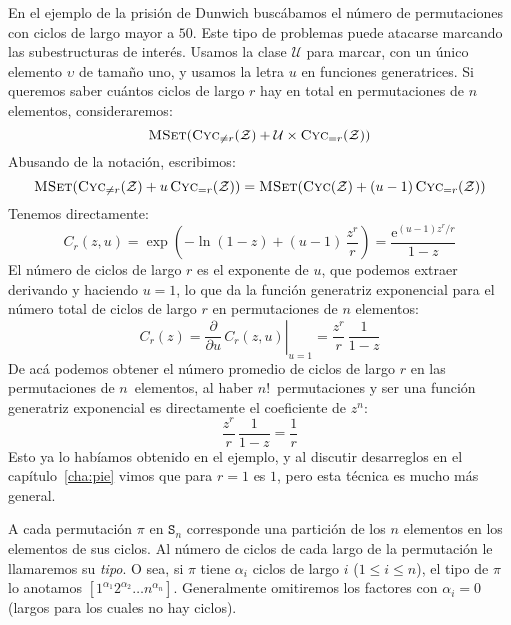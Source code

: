   En el ejemplo de la prisión de Dunwich
  buscábamos el número de permutaciones
  con ciclos de largo mayor a \(50\).
  Este tipo de problemas puede atacarse
  marcando las subestructuras de interés.%
  Usamos la clase \(\mathcal{U}\) para marcar,
  con un único elemento \(\upsilon\) de tamaño uno,
  y usamos la letra \(u\) en funciones generatrices.
  Si queremos saber cuántos ciclos de largo \(r\) hay en total
  en permutaciones de \(n\) elementos,
  consideraremos:
  \begin{equation*}
    \operatorname{\textsc{MSet}}(\operatorname{\textsc{Cyc}}_{\ne r}(\mathcal{Z})
	      + \mathcal{U} \times \operatorname{\textsc{Cyc}}_{= r}(\mathcal{Z}))
  \end{equation*}
  Abusando de la notación,
  escribimos:
  \begin{equation*}
    \operatorname{\textsc{MSet}}(\operatorname{\textsc{Cyc}}_{\ne r}(\mathcal{Z})
	      + u \operatorname{\textsc{Cyc}}_{= r}(\mathcal{Z}))
      = \operatorname{\textsc{MSet}}(\operatorname{\textsc{Cyc}}(\mathcal{Z}) + (u - 1) \operatorname{\textsc{Cyc}}_{= r}(\mathcal{Z}))
  \end{equation*}
  Tenemos directamente:
  \begin{equation*}
    C_r(z, u)
      = \exp \left( - \ln (1 - z) + (u - 1) \, \frac{z^r}{r}\right)
      = \frac{\mathrm{e}^{(u - 1) z^r / r}}{1 - z}
  \end{equation*}
  El número de ciclos de largo \(r\) es el exponente de \(u\),
  que podemos extraer derivando y haciendo \(u = 1\),
  lo que da la función generatriz exponencial
  para el número total de ciclos de largo \(r\)
  en permutaciones de \(n\) elementos:
  \begin{equation*}
    C_r(z)
      = \left.
	  \frac{\partial}{\partial u} \, C_r(z, u)
	\right\rvert_{u = 1}
      = \frac{z^r}{r} \, \frac{1}{1 - z}
  \end{equation*}
  De acá podemos obtener el número promedio de ciclos de largo \(r\)
  en las permutaciones de \(n\)~elementos,
  al haber \(n!\)~permutaciones
  y ser una función generatriz exponencial
  es directamente el coeficiente de \(z^n\):
  \begin{equation*}
    [ z^n ] \frac{z^r}{r} \, \frac{1}{1 - z}
      = \frac{1}{r}
  \end{equation*}
  Esto ya lo habíamos obtenido en el ejemplo,
  y al discutir desarreglos en el capítulo~\ref{cha:pie}%
  vimos que para \(r = 1\) es \(1\),
  pero esta técnica es mucho más general.

  A cada permutación \(\pi\) en \(\mathtt{S}_n\)
  corresponde una partición de los \(n\) elementos
  en los elementos de sus ciclos.
  Al número de ciclos de cada largo de la permutación
  le llamaremos su \emph{tipo}.%
  O sea,
  si \(\pi\) tiene \(\alpha_i\) ciclos de largo \(i\)
  (\(1 \le i \le n\)),
  el tipo de \(\pi\) lo anotamos
  \([1^{\alpha_1} 2^{\alpha_2} \dotso n^{\alpha_n}]\).
  Generalmente omitiremos los factores con \(\alpha_i = 0\)
  (largos para los cuales no hay ciclos).

